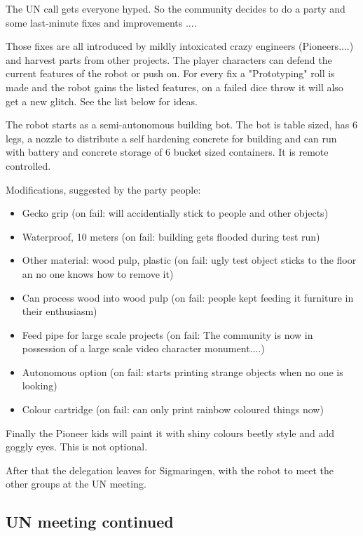 The UN call gets everyone hyped. So the community decides to do a party and some last-minute fixes and improvements ....

Those fixes are all introduced by mildly intoxicated crazy engineers (Pioneers....) and harvest parts from other projects. The player characters can defend the current features of the robot or push on. For every fix a "Prototyping" roll is made and the robot gains the listed features, on a failed dice throw it will also get a new glitch. See the list below for ideas.

The robot starts as a semi-autonomous building bot. The bot is table sized, has 6 legs, a nozzle to distribute a self hardening concrete for building and can run with battery and concrete storage of 6 bucket sized containers. It is remote controlled.

Modifications, suggested by the party people:

\begin{itemize}
    \item Gecko grip (on fail: will accidentially stick to people and other objects)
    \item Waterproof, 10 meters (on fail: building gets flooded during test run)
    \item Other material: wood pulp, plastic (on fail: ugly test object sticks to the floor an no one knows how to remove it)
    \item Can process wood into wood pulp (on fail: people kept feeding it furniture in their enthusiasm)
    \item Feed pipe for large scale projects (on fail: The community is now in possession of a large scale video character monument....)
    \item Autonomous option (on fail: starts printing strange objects when no one is looking)
    \item Colour cartridge (on fail: can only print rainbow coloured things now)
\end{itemize}

Finally the Pioneer kids will paint it with shiny colours beetly style and add goggly eyes. This is not optional.

After that the delegation leaves for Sigmaringen, with the robot to meet the other groups at the UN meeting.

\subsection{UN meeting continued}

